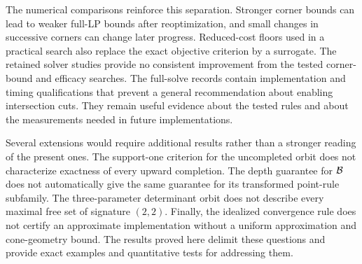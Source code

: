 The numerical comparisons reinforce this separation. Stronger corner
bounds can lead to weaker full-LP bounds after reoptimization, and small
changes in successive corners can change later progress. Reduced-cost
floors used in a practical search also replace the exact objective
criterion by a surrogate. The retained solver studies provide no
consistent improvement from the tested corner-bound and efficacy
searches. The full-solve records contain implementation and timing
qualifications that prevent a general recommendation about enabling
intersection cuts. They remain useful evidence about the tested rules
and about the measurements needed in future implementations.

Several extensions would require additional results rather than a
stronger reading of the present ones. The support-one criterion for
the uncompleted orbit does not characterize exactness of every upward
completion. The depth guarantee for $\mathcal B$ does not automatically give
the same guarantee for its transformed point-rule subfamily. The
three-parameter determinant orbit does not describe every maximal
free set of signature $(2,2)$. Finally, the idealized convergence rule
does not certify an approximate implementation without a uniform
approximation and cone-geometry bound. The results proved here delimit
these questions and provide exact examples and quantitative tests for
addressing them.
